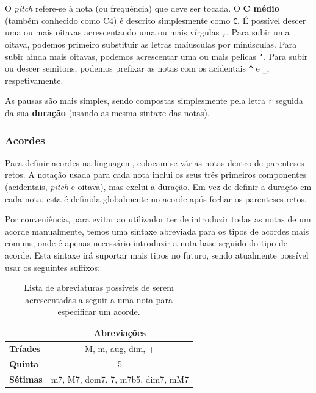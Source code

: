 O \textit{pitch} refere-se à nota (ou frequência) que deve ser tocada. O \textbf{C médio} (também conhecido como C4) é descrito simplesmente como \texttt{C}. É possível descer uma ou mais oitavas acrescentando uma ou mais vírgulas \texttt{,}. Para subir uma oitava, podemos primeiro substituir as letras maíusculas por minúsculas. Para subir ainda mais oitavas, podemos acrescentar uma ou mais pelicas \texttt{'}. Para subir ou descer semitons, podemos prefixar as notas com os acidentais \textbf{\texttt{\textasciicircum{}}} e \textbf{\texttt{\_}}, respetivamente.

As pausas são mais simples, sendo compostas simplesmente pela letra \texttt{r} seguida da sua \textbf{duração} (usando as mesma sintaxe das notas).

\subsubsection{\textbf{Acordes}}
Para definir acordes na linguagem, colocam-se várias notas dentro de parenteses retos. A notação usada para cada nota inclui os seus três primeiros componentes (acidentais, \textit{pitch} e oitava), mas exclui a duração. Em vez de definir a duração em cada nota, esta é definida globalmente no acorde após fechar os parenteses retos.

Por conveniência, para evitar ao utilizador ter de introduzir todas as notas de um acorde manualmente, temos uma sintaxe abreviada para os tipos de acordes mais comuns, onde é apenas necessário introduzir a nota base seguido do tipo de acorde. Esta sintaxe irá suportar mais tipos no futuro, sendo atualmente possível usar os seguintes suffixos:

\begin{table}[h]
\centering
\def\arraystretch{1.3}
\begin{tabular}{|l|c|}
\hline
\textbf{}        & \textbf{Abreviações}           \\ \hline
\textbf{Tríades} & M, m, aug, dim, +                \\ \hline
\textbf{Quinta}  & 5                                \\ \hline
\textbf{Sétimas} & m7, M7, dom7, 7, m7b5, dim7, mM7 \\ \hline
\end{tabular}
\caption{Lista de abreviaturas possíveis de serem acrescentadas a seguir a uma nota para especificar um acorde.}
\label{tab:modifiers-list}
\end{table}

